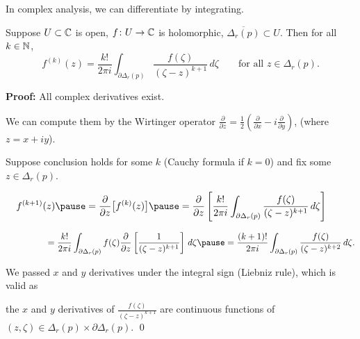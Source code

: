 \documentclass[10pt,aspectratio=169]{beamer}
\begin{document}
\begin{frame}
In complex analysis, we can differentiate by integrating.

\pause

\begin{theorem}
Suppose $U \subset {\mathbb{C}}$ is open, $f \colon U \to {\mathbb{C}}$ is holomorphic,
$\overline{\Delta_r(p)} \subset U$.
Then for all $k \in {\mathbb{N}}$,
\[
f^{(k)}(z)
=
\frac{k!}{2\pi i}
\int_{\partial \Delta_r(p)}
\frac{f(\zeta)}{(\zeta-z)^{k+1}}
\,
d \zeta
\qquad
\text{for all } z \in \Delta_r(p) .
\]
\end{theorem}

\pause

\textbf{Proof:}
All complex derivatives exist.

\pause

We can compute them by
the Wirtinger operator
$\frac{\partial}{\partial z} =
\frac{1}{2}
\left(
\frac{\partial}{\partial x} - i
\frac{\partial}{\partial y}
\right)$,
(where $z=x+iy$).
\pause

Suppose conclusion holds for some $k$ (Cauchy formula if $k=0$) and fix some $z \in \Delta_r(p)$.

\medskip
\pause

$\displaystyle
\quad
f^{(k+1)}(z)
\pause
=
\frac{\partial }{\partial z}
\bigl[ f^{(k)}(z) \bigr]
\pause
=
\frac{\partial }{\partial z}
\left[
\frac{k!}{2\pi i}
\int_{\partial \Delta_r(p)}
\frac{f(\zeta)}{(\zeta-z)^{k+1}}
\,
d \zeta
\right]
$

\medskip
\pause

$\displaystyle
\qquad \qquad \,\,\,\,
= 
\frac{k!}{2\pi i}
\int_{\partial \Delta_r(p)}
f(\zeta)
\frac{\partial }{\partial z}
\left[
\frac{1}{(\zeta-z)^{k+1}}
\right]
\,
d \zeta
\pause
= 
\frac{(k+1)!}{2\pi i}
\int_{\partial \Delta_r(p)}
\frac{f(\zeta)}{(\zeta-z)^{k+2}}
\,
d \zeta .
$

\pause
\medskip

We passed $x$ and $y$ derivatives under the integral sign (Liebniz rule),
\pause
which is valid as

the $x$ and $y$ derivatives of
$\frac{f(\zeta)}{(\zeta-z)^{k+1}}$ are continuous
functions of $(z,\zeta) \in \Delta_r(p) \times \partial \Delta_r(p)$.
\qed
\end{frame}
\end{document}
